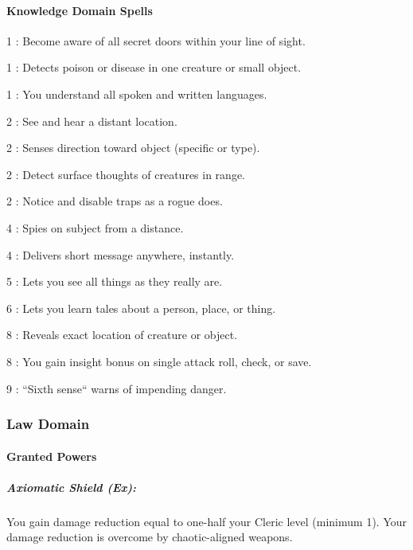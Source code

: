 \paragraph{Knowledge Domain Spells}
\begin{list}{}{\leftmargin=1em}
\item[1] : Become aware of all secret doors within your line of sight.
\item[1] : Detects poison or disease in one creature or small object.
\item[1] : You understand all spoken and written languages.
\item[2] : See and hear a distant location.
\item[2] : Senses direction toward object (specific or type).
\item[2] : Detect surface thoughts of creatures in range.
\item[2] : Notice and disable traps as a rogue does.
\item[4] : Spies on subject from a distance.
\item[4] : Delivers short message anywhere, instantly.
\item[5] : Lets you see all things as they really are.
\item[6] : Lets you learn tales about a person, place, or thing.
\item[8] : Reveals exact location of creature or object.
\item[8] : You gain insight bonus on single attack roll, check, or save.
\item[9] : ``Sixth sense`` warns of impending danger.
\end{list}
\subsubsection{Law Domain}
\paragraph{Granted Powers}
\subparagraph{Axiomatic Shield (Ex):}
You gain damage reduction equal to one-half your Cleric level (minimum 1).
Your damage reduction is overcome by chaotic-aligned weapons.

